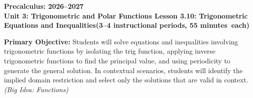 \documentclass[10pt]{article}
\newcommand{\CourseName}{Precalculus}
\newcommand{\SchoolYear}{2026--2027}
\newcommand{\MeetingLength}{55 minutes}
\newcommand{\UnitNumberName}{Unit 3: Trigonometric and Polar Functions \quad}
\newcommand{\LessonNumberName}{Lesson 3.10: Trigonometric Equations and Inequalities}
\begin{document}
\begin{center}
  {\Large\bfseries \CourseName: \SchoolYear} \\[4pt]
  {\small\bfseries \UnitNumberName \LessonNumberName \quad (3--4 instructional periods, \MeetingLength\ each)}
\end{center}

\begin{tcolorbox}[colback=sky, colframe=navy, boxrule=0.9pt, arc=2mm,
    left=2mm, right=2mm, top=1.5mm, bottom=1.5mm]
  \textbf{Primary Objective:} Students will solve equations and inequalities
  involving trigonometric functions by isolating the trig function, applying
  inverse trigonometric functions to find the principal value, and using
  periodicity to generate the general solution. In contextual scenarios,
  students will identify the implied domain restriction and select only
  the solutions that are valid in context.
  \textit{(Big Idea: Functions)}
\end{tcolorbox}

\vspace{0.08in}
\end{document}
